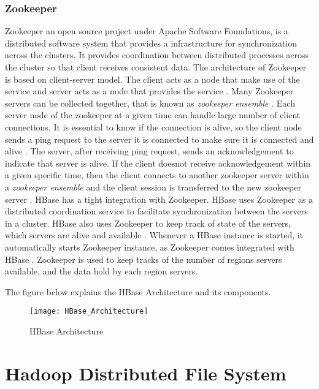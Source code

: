 \documentclass[11pt,a4paper,bibtotoc,idxtotoc,headsepline,footsepline,footexclude,BCOR12mm,DIV13]{scrbook}
\begin{document}
\subsubsection{Zookeeper}
\label{zookeeper}
Zookeeper an open source project under Apache Software Foundations, is a distributed software system that provides a infrastructure for synchronization across the clusters. It provides coordination between distributed processes across the cluster so that client receives consistent data. The architecture of Zookeeper is based on client-server model. The client acts as a node that make use of the service and server acts as a node that provides the service \cite{hbase:zookeeper}. Many Zookeeper servers can be collected together, that is known as \emph{zookeeper ensemble} \cite{hbase:zookeeper}. Each server node of the zookeeper at a given time can handle large number of client connections. It is essential to know if the connection is alive, so the client node sends a ping request to the server it is connected to make sure it is connected and alive \cite{hbase:zookeeper}. The server, after receiving ping request, sends an acknowledgement to indicate that server is alive. If the client doesnot receive acknowledgement within a given specific time, then the client connects to another zookeeper server within a \emph{zookeeper ensemble} and the client session is transferred to the new zookeeper server \cite{hbase:zookeeper}.
\newline
HBase has a tight integration with Zookeeper. HBase uses Zookeeper as a distributed coordination service to facilitate synchronization between the servers in a cluster. HBase also uses Zookeeper to keep track of state of the servers, which servers are alive and available \cite{hbase:architecture}. Whenever a HBase instance is started, it automatically starts Zookeeper instance, as Zookeeper comes integrated with HBase \cite{hbase:insights}. Zookeeper is used to keep tracks of the number of regions servers available, and the data hold by each region servers. 
\newline

The figure below explains the HBase Architecture and its components.
\begin{figure}
	\centering
	\texttt{[image: HBase\_Architecture]}
	\caption{HBase Architecture}
	\label{fig:hbasetable}
\end{figure}

\newpage
\section{Hadoop Distributed File System}
\label{Hadoop Distributed File System}
\end{document}
